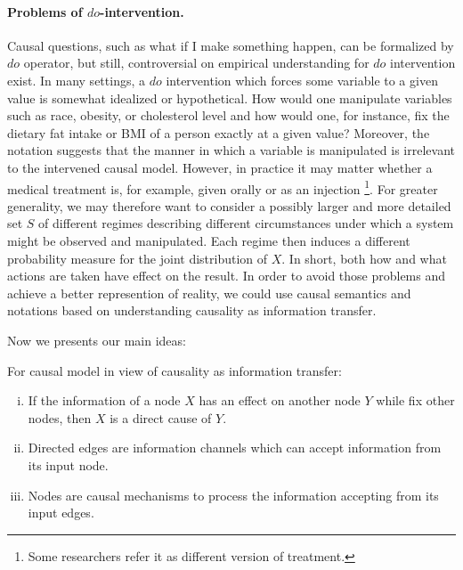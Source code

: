 \paragraph{Problems of $do$-intervention.} Causal questions, such as what if I make something happen, can be formalized by $do$ operator, but still, controversial on empirical understanding for $do$ intervention exist. In many settings, a $do$ intervention which forces some variable to a given value is somewhat idealized or hypothetical. How would one manipulate variables such as race, obesity, or cholesterol level and how would one, for instance, fix the dietary fat intake or BMI of a person exactly at a given value?   Moreover, the notation suggests that the manner in which  a variable is manipulated is irrelevant to the intervened causal model. However, in practice it may matter whether a medical treatment is, for example, given orally or as an injection \footnote{Some researchers refer it as different version of treatment\cite{Hernan2019}.}. For greater generality, we may therefore want to consider a possibly larger and more detailed set $S$ of different regimes describing different circumstances under which a system might be observed and manipulated. Each regime then induces a different probability measure for the joint distribution of $X$. In short, both how and what actions are taken have effect on the result\cite{Marloes2018}.  In order to avoid those problems and achieve a better represention of reality, we could use causal semantics and notations based on understanding causality as information transfer.


Now we presents our main ideas:

\begin{Prin}
	\label{Prin:info}
	 For causal model in view of causality as information transfer:	
	\begin{enumerate}[i)]
		\item If the information of a node $X$ has an effect on another node $Y$ while fix other nodes, then $X$ is a direct cause of $Y$. 
		\item Directed edges are information channels which can accept information from its input node. 
		\item Nodes are causal mechanisms to process the information accepting from its input edges. 
	\end{enumerate}	
\end{Prin}


